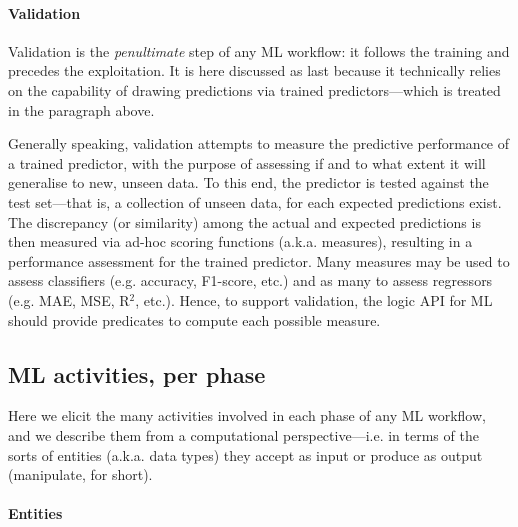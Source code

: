 \documentclass[runningheads]{llncs}
\begin{document}
\paragraph{Validation}
%
Validation is the \emph{penultimate} step of any ML workflow: it follows the training and precedes the exploitation.
%
It is here discussed as last because it technically relies on the capability of drawing predictions via trained predictors---which is treated in the paragraph above.

Generally speaking, validation attempts to measure the predictive performance of a trained predictor, with the purpose of assessing if and to what extent it will generalise to new, unseen data.
%
To this end, the predictor is tested against the test set---that is, a collection of unseen data, for each expected predictions exist.
%
The discrepancy (or similarity) among the actual and expected predictions is then measured via ad-hoc scoring functions (a.k.a. measures), resulting in a performance assessment for the trained predictor.
%
Many measures may be used to assess classifiers (e.g. accuracy, F1-score, etc.) and as many to assess regressors (e.g. MAE, MSE, R$^2$, etc.).
%
Hence, to support validation, the logic API for ML should provide predicates to compute each possible measure.

\subsection{ML activities, per phase}
\label{ssec:modelling}

Here we elicit the many activities involved in each phase of any ML workflow, and we describe them from a computational perspective---i.e. in terms of the sorts of entities (a.k.a. data types) they accept as input or produce as output (manipulate, for short).

\paragraph{Entities}
\end{document}
